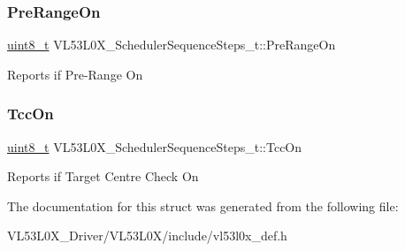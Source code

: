 \subsubsection{\texorpdfstring{Pre\+Range\+On}{PreRangeOn}}
{\footnotesize\ttfamily \hyperlink{vl53l0x__types_8h_aba7bc1797add20fe3efdf37ced1182c5}{uint8\+\_\+t} V\+L53\+L0\+X\+\_\+\+Scheduler\+Sequence\+Steps\+\_\+t\+::\+Pre\+Range\+On}

Reports if Pre-\/\+Range On \mbox{\label{structVL53L0X__SchedulerSequenceSteps__t_ad09b2b45d76b1c173b16b88f68bc8503}} 
\subsubsection{\texorpdfstring{Tcc\+On}{TccOn}}
{\footnotesize\ttfamily \hyperlink{vl53l0x__types_8h_aba7bc1797add20fe3efdf37ced1182c5}{uint8\+\_\+t} V\+L53\+L0\+X\+\_\+\+Scheduler\+Sequence\+Steps\+\_\+t\+::\+Tcc\+On}

Reports if Target Centre Check On 

The documentation for this struct was generated from the following file\+:\begin{DoxyCompactItemize}
\item 
V\+L53\+L0\+X\+\_\+\+Driver/\+V\+L53\+L0\+X/include/vl53l0x\+\_\+def.\+h\end{DoxyCompactItemize}
